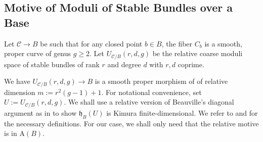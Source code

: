 \documentclass[11pt]{amsart}
\theoremstyle{definition}
\newcommand{\ri}{\rightarrow}
\newcommand{\U}{\mathscr{U}}
\newcommand{\mC}{\mathcal{C}}
\begin{document}
\subsection{Motive of Moduli of Stable Bundles over a Base}\label{Motives of Bundles on Curves over a Base}
  Let $\mathcal C \rightarrow B$ be such that for any closed point $b\in B$, the fiber $C_b$ is a smooth, proper curve of genus $g\geq 2$. Let $ U_{\mathcal C/B}(r,d,g)$ be the relative coarse moduli space of stable bundles of rank $r$ and degree $d$ with $r,d$ coprime. 
  
  We have $ U_{\mathcal{C}/B} (r,d,g)\ri B$ is a smooth proper morphism of of  relative dimension $m:=r^2(g-1)+1$. For notational convenience, set $U:=U_{\mathcal C/B}(r,d,g)$. We shall use a relative version of Beauville's diagonal argument as in \cite{MR1351502} to show $\mathfrak h_B(U)$ is Kimura finite-dimensional. We refer to \cite{MR2107443} and \cite{MR3851129} for the necessary definitions. For our case, we shall only need that the relative motive is in $\mathrm A(B)$. 
\end{document}
